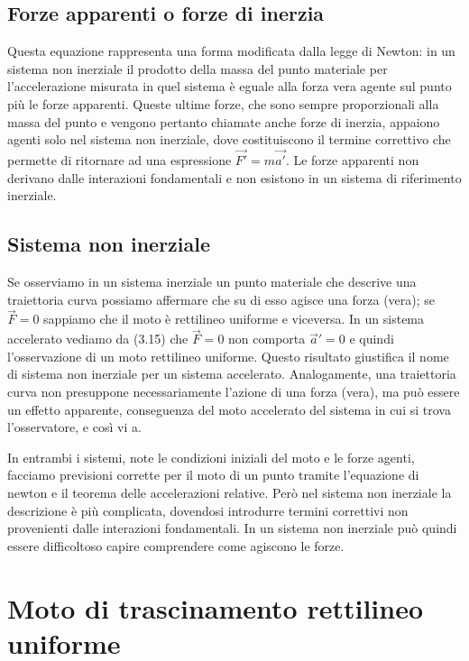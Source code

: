\documentclass[class=book, crop=false, oneside, 12pt]{standalone}
\begin{document}
\subsection{Forze apparenti o forze di inerzia}
Questa equazione rappresenta una forma modificata dalla legge di Newton: in un sistema non inerziale il prodotto della massa del punto materiale per l'accelerazione misurata in quel sistema è eguale alla forza vera agente sul punto più le forze apparenti. 
Queste ultime forze, che sono sempre proporzionali alla massa del punto e vengono pertanto chiamate anche forze di inerzia, appaiono agenti solo nel sistema non inerziale, dove costituiscono il termine correttivo che permette di ritornare ad una espressione \(\overrightarrow{F'} = m \overrightarrow{a'}\).
Le forze apparenti non derivano dalle interazioni fondamentali e non esistono in un sistema di riferimento inerziale.

\subsection{Sistema non inerziale}

Se osserviamo in un sistema inerziale un punto materiale che descrive una traiettoria curva possiamo affermare che su di esso agisce una forza (vera); se \(\overrightarrow{F} = 0\) sappiamo che il moto è rettilineo uniforme e viceversa.\newline
In un sistema accelerato vediamo da (3.15) che \(\overrightarrow{F} = 0\) non comporta \(\overrightarrow{a}' = 0\) e quindi l'osservazione di un moto rettilineo uniforme. 
Questo risultato giustifica il nome di sistema non inerziale per un sistema accelerato. 
Analogamente, una traiettoria curva non presuppone necessariamente l'azione di una forza (vera), ma può essere un effetto apparente, conseguenza del moto accelerato del sistema in cui si trova l'osservatore, e così vi a.

In entrambi i sistemi, note le condizioni iniziali del moto e le forze agenti, facciamo previsioni corrette per il moto di un punto tramite l'equazione di newton e il teorema delle accelerazioni relative. 
Però nel sistema non inerziale la descrizione è più complicata, dovendosi introdurre termini correttivi non provenienti dalle interazioni fondamentali.
In un sistema non inerziale può quindi essere difficoltoso capire comprendere come agiscono le forze. 

\section{Moto di trascinamento rettilineo uniforme}
\end{document}
